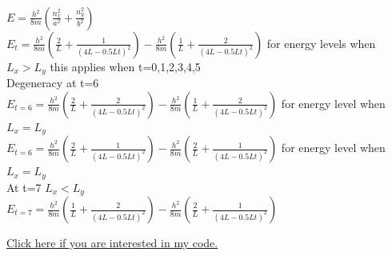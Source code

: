 \documentclass{article}
\begin{document}
\begin{enumerate}
\\ $E=\frac{h^2}{8m}(\frac{n_x^2}{a^2}+\frac{n_y^2}{b^2})$
\\ $E_t=\frac{h^2}{8m}\left(\frac{2}{L}+\frac{1}{(4L-0.5Lt)^2}\right)-\frac{h^2}{8m}\left(\frac{1}{L}+\frac{2}{(4L-0.5Lt)^2}\right)$ for energy levels when $L_x>L_y$ this applies when t=0,1,2,3,4,5
\\ Degeneracy at t=6
\\ $E_{t=6}=\frac{h^2}{8m}\left(\frac{2}{L}+\frac{2}{(4L-0.5Lt)^2}\right)-\frac{h^2}{8m}\left(\frac{1}{L}+\frac{2}{(4L-0.5Lt)^2}\right)$ for energy level when $L_x=L_y$
\\ $E_{t=6}=\frac{h^2}{8m}\left(\frac{2}{L}+\frac{1}{(4L-0.5Lt)^2}\right)-\frac{h^2}{8m}\left(\frac{2}{L}+\frac{1}{(4L-0.5Lt)^2}\right)$ for energy level when $L_x=L_y$
\\ At t=7 $L_x<L_y$
\\ $E_{t=7}=\frac{h^2}{8m}\left(\frac{1}{L}+\frac{2}{(4L-0.5Lt)^2}\right)-\frac{h^2}{8m}\left(\frac{2}{L}+\frac{1}{(4L-0.5Lt)^2}\right)$

\end{enumerate}%
\href{https://github.com/lexinsea/teaching/tree/main/quantum-chemistry}{Click here if you are interested in my code.}
\end{document}
